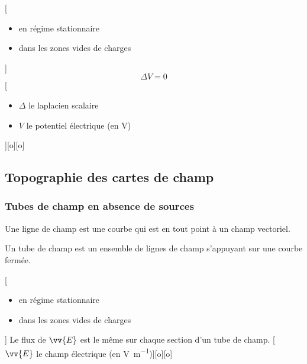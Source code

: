 
[\begin{itemize}
    \item en régime stationnaire
    \item dans les zones vides de charges
\end{itemize}]
{$$\Delta V=0$$}
[
    \begin{itemize}
        \item $\Delta$ le laplacien scalaire
        \item $V$ le potentiel électrique (en \unit{V})
    \end{itemize}
][o][o]



\subsection{Topographie des cartes de champ}

\subsubsection{Tubes de champ en absence de sources}

Une ligne de champ est une courbe qui est en tout point à un champ vectoriel.

Un tube de champ est un ensemble de lignes de champ s'appuyant sur une courbe fermée.

[
    \begin{itemize}
        \item en régime stationnaire
        \item dans les zones vides de charges
    \end{itemize}
]
{Le flux de $\vv{E}$ est le même sur chaque section d'un tube de champ.}
[$\vv{E}$ le champ électrique (en \unit{V.m^{-1}})\schema{}{3cm}][o][o]


